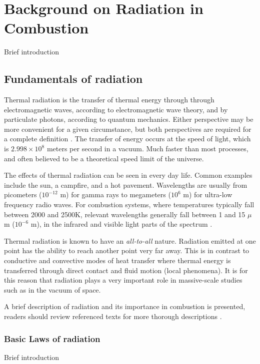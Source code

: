 \addchapheadtotoc
\chapter{Background on Radiation in Combustion}\label{chapter:Importance}
Brief introduction

\section{Fundamentals of radiation} \label{Sec:FundOfRad}
Thermal radiation is the transfer of thermal energy through through electromagnetic waves, according to electromagnetic wave theory, and by particulate photons, according to quantum mechanics. 
Either perspective may be more convenient for a given circumstance, but both perspectives are required for a complete definition \cite{Modest2013RadiativeTransfer}. The transfer of energy occurs at the speed of light, which is $2.998 \times 10^8$ meters per second in a vacuum.
Much faster than most processes, and often believed to be a theoretical speed limit of the universe.

The effects of thermal radiation can be seen in every day life. Common examples include the sun, a campfire, and a hot pavement. 
Wavelengths are usually from picometers ($10^{-12}$ m) for gamma rays to megameters ($10^6$ m) for ultra-low frequency radio waves.
For combustion systems, where temperatures typically fall between 2000 and 2500K, relevant wavelengths generally fall between 1 and 15 $\mu{}$m ($10^{-6}$ m), in the infrared and visible light parts of the spectrum \cite{Liu2020TheFlames}.

Thermal radiation is known to have an \textit{all-to-all} nature. Radiation emitted at one point has the ability to reach another point very far away. 
This is in contrast to conductive and convective modes of heat transfer where thermal energy is transferred through direct contact and fluid motion (local phenomena). 
It is for this reason that radiation plays a very important role in massive-scale studies such as in the vacuum of space.

A brief description of radiation and its importance in combustion is presented,
readers should review referenced texts for more thorough descriptions \cite{Howell2010ThermalTransfer,Modest2013RadiativeTransfer}.

\subsection{Basic Laws of radiation}
Brief introduction

